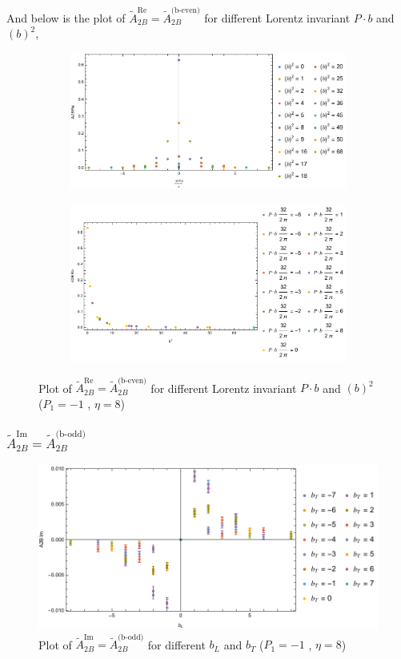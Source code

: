 \documentclass[]{article}
\numberwithin{equation}{section}
\newcommand{\tAmp}{\widetilde{A}}
\newcommand{\tAmp}{\ensuremath{\widetilde{A}^{(+)}}}
\begin{document}
And below is the plot of $\tAmp^{\text{Re}}_{2B}=\tAmp^{\text{(b-even)}}_{2B}$ for different Lorentz invariant $P\cdot b$ and $(b)^2$,
\begin{figure}[h!]
     \centering
     \begin{subfigure}[b]{0.45\textwidth}
         \centering
         \includegraphics[width=\textwidth]{bP_A2B_b_even_P1_-1_eta_8.pdf}
     \end{subfigure}
     \begin{subfigure}[b]{0.45\textwidth}
         \centering
         \includegraphics[width=\textwidth]{bsq_A2B_b_even_P1_-1_eta_8.pdf}
     \end{subfigure}
        \caption{Plot of $\tAmp^{\text{Re}}_{2B}=\tAmp^{\text{(b-even)}}_{2B}$ for different Lorentz invariant $P\cdot b$ and $(b)^2$  ($P_{1} = -1$ , $\eta=8$)}
\end{figure}

\subsubsection{$\tAmp^{\text{Im}}_{2B}=\tAmp^{\text{(b-odd)}}_{2B}$}
\begin{figure}[h!]
    \centering
    \includegraphics[width=0.45\linewidth]{bLbT_A2B_b_odd_P1_-1_eta_8.pdf}
    \caption{Plot of  $\tAmp^{\text{Im}}_{2B}=\tAmp^{\text{(b-odd)}}_{2B}$ for different $b_{L}$ and $b_{T}$  ($P_{1} = -1$ , $\eta=8$)}
\end{figure}
\end{document}

